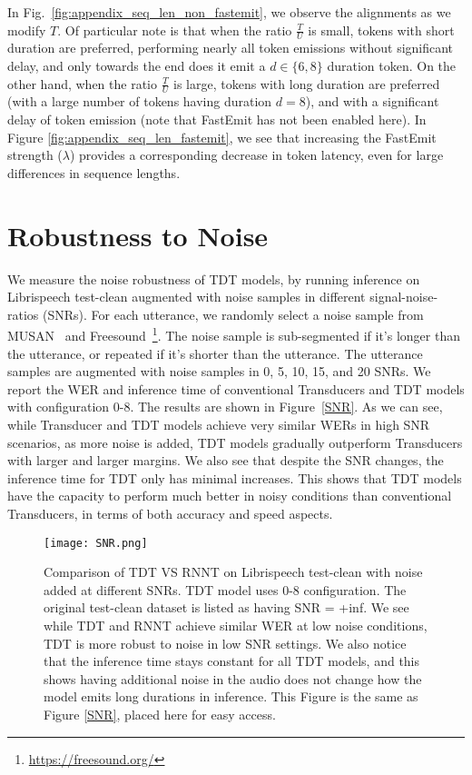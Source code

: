 \documentclass{article}
\begin{document}
In Fig.~\ref{fig:appendix_seq_len_non_fastemit}, we observe the alignments as we modify $T$. Of particular note is that when the ratio $\frac{T}{U}$ is small, tokens with short duration are preferred, performing nearly all token emissions without significant delay, and only towards the end does it emit a $d \in \{ 6, 8 \}$ duration token. On the other hand, when the ratio $\frac{T}{U}$ is large, tokens with long duration are preferred (with a large number of tokens having duration $d = 8$), and with a significant delay of token emission (note that FastEmit has not been enabled here). In Figure \ref{fig:appendix_seq_len_fastemit}, we see that increasing the FastEmit strength ($\lambda$) provides a corresponding decrease in token latency, even for large differences in sequence lengths.


\section{Robustness to Noise}
We measure the noise robustness of TDT models, by running inference on Librispeech test-clean augmented with noise samples in different signal-noise-ratios (SNRs). For each utterance, we randomly select a noise sample from MUSAN~\cite{snyder2015musan} and Freesound~\footnote{\url{https://freesound.org/}}. 
The noise sample is sub-segmented if it's longer than the utterance, or repeated if it's shorter than the utterance. The utterance samples are augmented with noise samples in 0, 5, 10, 15, and 20 SNRs.
We report the WER and inference time of conventional Transducers and TDT models with configuration 0-8. The results are shown in Figure~\ref{SNR}. As we can see, while Transducer and TDT models achieve very similar WERs in high SNR scenarios, as more noise is added, TDT models gradually outperform Transducers with larger and larger margins.  We also see that despite the SNR changes, the inference time for TDT only has minimal increases. This shows that TDT models have the capacity to perform much better in noisy conditions than conventional Transducers, in terms of both accuracy and speed aspects.





\begin{figure}[t]
    \centering
    \texttt{[image: SNR.png]}
    \caption{Comparison of TDT VS RNNT on Librispeech test-clean with noise added at different SNRs. TDT model uses 0-8 configuration. The original test-clean dataset is listed as having SNR = +inf. We see while TDT and RNNT achieve similar WER at low noise conditions, TDT is more robust to noise in low SNR settings. We also notice that the inference time stays constant for all TDT models, and this shows having additional noise in the audio does not change how the model emits long durations in inference. This Figure is the same as Figure \ref{SNR}, placed here for easy access.}
    \label{SNR2}
\end{figure}
\end{document}
